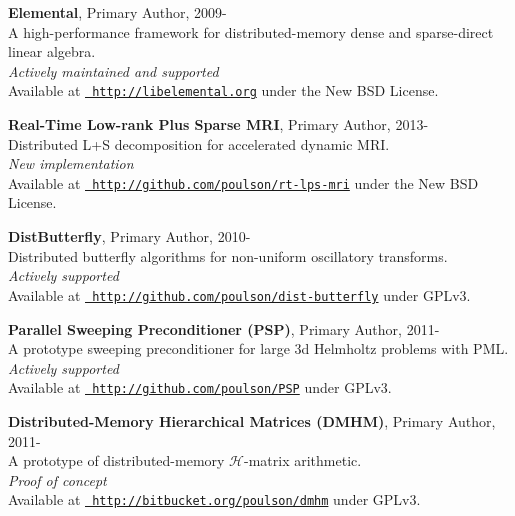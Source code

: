 \documentclass[letterpaper]{article}
\renewenvironment{itemize}{
  \begin{list}{}{
    \setlength{\leftmargin}{1.5em}
  }
}{
  \end{list}
}
\begin{document}
\begin{itemize}
\item {\bf Elemental}, Primary Author, 2009-\\
A high-performance framework for distributed-memory dense and sparse-direct linear algebra.\\ 
{\it Actively maintained and supported}\\
Available at 
\href{http://libelemental.org}{\tt 
      http://libelemental.org} under the New BSD License.

\item {\bf Real-Time Low-rank Plus Sparse MRI}, Primary Author, 2013-\\
Distributed L+S decomposition for accelerated dynamic MRI.\\ 
{\it New implementation}\\
Available at
\href{http://github.com/poulson/rt-lps-mri}{\tt
      http://github.com/poulson/rt-lps-mri} under the New BSD License.

\item {\bf DistButterfly}, Primary Author, 2010-\\
Distributed butterfly algorithms for non-uniform oscillatory transforms.\\
{\it Actively supported}\\
Available at
\href{http://github.com/poulson/dist-butterfly}{\tt
      http://github.com/poulson/dist-butterfly} under GPLv3.

\item {\bf Parallel Sweeping Preconditioner (PSP)}, Primary Author, 2011-\\
A prototype sweeping preconditioner for large 3d Helmholtz problems with  PML.\\
{\it Actively supported}\\
Available at
\href{http://github.com/poulson/PSP}{\tt
      http://github.com/poulson/PSP} under GPLv3.

\item {\bf Distributed-Memory Hierarchical Matrices (DMHM)}, Primary Author, 2011-\\
A prototype of distributed-memory $\mathcal{H}$-matrix arithmetic. \\
{\it Proof of concept}\\
Available at
\href{http://bitbucket.org/poulson/dmhm}{\tt
      http://bitbucket.org/poulson/dmhm} under GPLv3.


\end{itemize}
\end{document}
